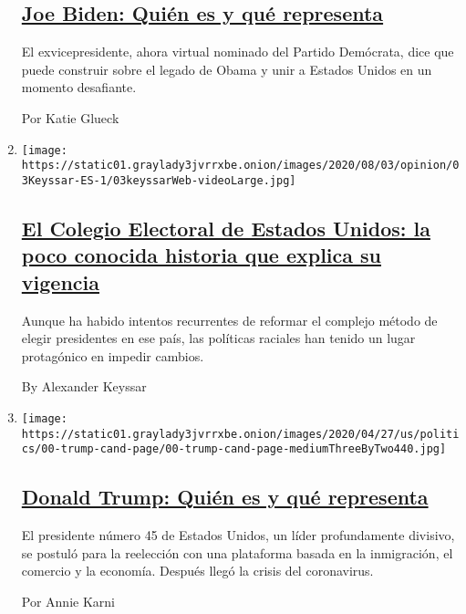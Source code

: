 \begin{enumerate}
  \hypertarget{joe-biden-quiuxe9n-es-y-quuxe9-representa}{%
  \subsection{\texorpdfstring{\href{/es/interactive/2020/espanol/estados-unidos/joe-biden-elecciones.html}{Joe
  Biden: Quién es y qué
  representa}}{Joe Biden: Quién es y qué representa}}\label{joe-biden-quiuxe9n-es-y-quuxe9-representa}}

  El exvicepresidente, ahora virtual nominado del Partido Demócrata,
  dice que puede construir sobre el legado de Obama y unir a Estados
  Unidos en un momento desafiante.

  Por Katie Glueck
\item
  \texttt{[image: https://static01.graylady3jvrrxbe.onion/images/2020/08/03/opinion/03Keyssar-ES-1/03keyssarWeb-videoLarge.jpg]}

  \hypertarget{el-colegio-electoral-de-estados-unidos-la-poco-conocida-historia-que-explica-su-vigencia}{%
  \subsection{\texorpdfstring{\href{/es/2020/08/03/espanol/opinion/colegio-electoral-estados-unidos.html}{El
  Colegio Electoral de Estados Unidos: la poco conocida historia que
  explica su
  vigencia}}{El Colegio Electoral de Estados Unidos: la poco conocida historia que explica su vigencia}}\label{el-colegio-electoral-de-estados-unidos-la-poco-conocida-historia-que-explica-su-vigencia}}

  Aunque ha habido intentos recurrentes de reformar el complejo método
  de elegir presidentes en ese país, las políticas raciales han tenido
  un lugar protagónico en impedir cambios.

  By Alexander Keyssar
\item
  \texttt{[image: https://static01.graylady3jvrrxbe.onion/images/2020/04/27/us/politics/00-trump-cand-page/00-trump-cand-page-mediumThreeByTwo440.jpg]}

  \hypertarget{donald-trump-quiuxe9n-es-y-quuxe9-representa}{%
  \subsection{\texorpdfstring{\href{/es/interactive/2020/espanol/estados-unidos/donald-trump-elecciones.html}{Donald
  Trump: Quién es y qué
  representa}}{Donald Trump: Quién es y qué representa}}\label{donald-trump-quiuxe9n-es-y-quuxe9-representa}}

  El presidente número 45 de Estados Unidos, un líder profundamente
  divisivo, se postuló para la reelección con una plataforma basada en
  la inmigración, el comercio y la economía. Después llegó la crisis del
  coronavirus.

  Por Annie Karni
\end{enumerate}

